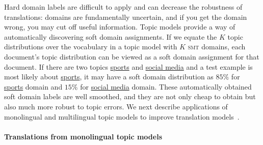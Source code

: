 Hard domain labels are difficult to apply and can decrease the robustness of translations: domains are fundamentally uncertain, and if you get the domain wrong, you may cut off useful information.
Topic models provide a way of automatically discovering soft domain
assignments. 
If we equate the $K$ topic distributions over the vocabulary in a topic model with $K$ 
\textsc{smt} domains, each document's topic distribution can be viewed as a soft
domain assignment for that document.
If there
are two topics \underline{sports} and \underline{social media} and
a test example is most likely about \underline{sports}, it may
have a soft domain distribution as $85\%$ for \underline{sports}
domain and $15\%$ for \underline{social media} domain. These automatically
obtained soft domain labels are well smoothed, and they are not only
cheap to obtain but also much more robust to topic errors. 
We next describe applications of monolingual and multilingual
topic models to improve translation models~\citep{Eidelman-12,hu-14}.





\paragraph{Translations from monolingual topic models}

